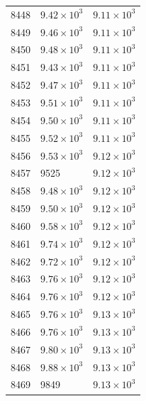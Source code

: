 \begin{table}[H]
\begin{tabular}{lll}
8448 & $\displaystyle 9.42 \times 10^{3}$ & $\displaystyle 9.11 \times 10^{3}$ \\
8449 & $\displaystyle 9.46 \times 10^{3}$ & $\displaystyle 9.11 \times 10^{3}$ \\
8450 & $\displaystyle 9.48 \times 10^{3}$ & $\displaystyle 9.11 \times 10^{3}$ \\
8451 & $\displaystyle 9.43 \times 10^{3}$ & $\displaystyle 9.11 \times 10^{3}$ \\
8452 & $\displaystyle 9.47 \times 10^{3}$ & $\displaystyle 9.11 \times 10^{3}$ \\
8453 & $\displaystyle 9.51 \times 10^{3}$ & $\displaystyle 9.11 \times 10^{3}$ \\
8454 & $\displaystyle 9.50 \times 10^{3}$ & $\displaystyle 9.11 \times 10^{3}$ \\
8455 & $\displaystyle 9.52 \times 10^{3}$ & $\displaystyle 9.11 \times 10^{3}$ \\
8456 & $\displaystyle 9.53 \times 10^{3}$ & $\displaystyle 9.12 \times 10^{3}$ \\
8457 & 9525 & $\displaystyle 9.12 \times 10^{3}$ \\
8458 & $\displaystyle 9.48 \times 10^{3}$ & $\displaystyle 9.12 \times 10^{3}$ \\
8459 & $\displaystyle 9.50 \times 10^{3}$ & $\displaystyle 9.12 \times 10^{3}$ \\
8460 & $\displaystyle 9.58 \times 10^{3}$ & $\displaystyle 9.12 \times 10^{3}$ \\
8461 & $\displaystyle 9.74 \times 10^{3}$ & $\displaystyle 9.12 \times 10^{3}$ \\
8462 & $\displaystyle 9.72 \times 10^{3}$ & $\displaystyle 9.12 \times 10^{3}$ \\
8463 & $\displaystyle 9.76 \times 10^{3}$ & $\displaystyle 9.12 \times 10^{3}$ \\
8464 & $\displaystyle 9.76 \times 10^{3}$ & $\displaystyle 9.12 \times 10^{3}$ \\
8465 & $\displaystyle 9.76 \times 10^{3}$ & $\displaystyle 9.13 \times 10^{3}$ \\
8466 & $\displaystyle 9.76 \times 10^{3}$ & $\displaystyle 9.13 \times 10^{3}$ \\
8467 & $\displaystyle 9.80 \times 10^{3}$ & $\displaystyle 9.13 \times 10^{3}$ \\
8468 & $\displaystyle 9.88 \times 10^{3}$ & $\displaystyle 9.13 \times 10^{3}$ \\
8469 & 9849 & $\displaystyle 9.13 \times 10^{3}$ \\

\end{tabular}
\end{table}
